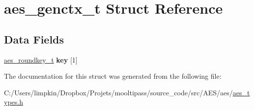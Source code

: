 \hypertarget{structaes__genctx__t}{\section{aes\+\_\+genctx\+\_\+t Struct Reference}
\label{structaes__genctx__t}
}
\subsection*{Data Fields}
\begin{DoxyCompactItemize}
\item 
\hypertarget{structaes__genctx__t_ad14597dc3319c5b64b7a5766962d1f5b}{\hyperlink{structaes__roundkey__t}{aes\+\_\+roundkey\+\_\+t} {\bfseries key} \mbox{[}1\mbox{]}}\label{structaes__genctx__t_ad14597dc3319c5b64b7a5766962d1f5b}

\end{DoxyCompactItemize}


The documentation for this struct was generated from the following file\+:\begin{DoxyCompactItemize}
\item 
C\+:/\+Users/limpkin/\+Dropbox/\+Projets/mooltipass/source\+\_\+code/src/\+A\+E\+S/aes/\hyperlink{aes__types_8h}{aes\+\_\+types.\+h}\end{DoxyCompactItemize}

